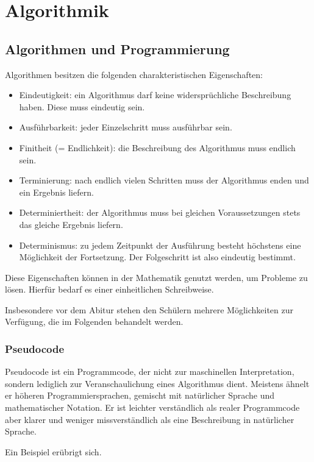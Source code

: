 \documentclass[main.tex]{subfiles}
\begin{document}
\chapter{Algorithmik}

\section{Algorithmen und Programmierung}
\begin{Definition}
	Algorithmen besitzen die folgenden charakteristischen Eigenschaften:
	\begin{itemize}
		\item Eindeutigkeit: ein Algorithmus darf keine widersprüchliche Beschreibung haben. Diese muss eindeutig sein.
		\item Ausführbarkeit: jeder Einzelschritt muss ausführbar sein.
		\item Finitheit (= Endlichkeit): die Beschreibung des Algorithmus muss endlich sein.
		\item Terminierung: nach endlich vielen Schritten muss der Algorithmus enden und ein Ergebnis liefern.
		\item Determiniertheit: der Algorithmus muss bei gleichen Voraussetzungen stets das gleiche Ergebnis liefern.
		\item   Determinismus: zu jedem Zeitpunkt der Ausführung besteht höchstens eine Möglichkeit der Fortsetzung. Der Folgeschritt ist also eindeutig bestimmt.
	\end{itemize}
\end{Definition}

Diese Eigenschaften können in der Mathematik genutzt werden, um Probleme zu lösen. Hierfür bedarf es einer einheitlichen Schreibweise.

Insbesondere vor dem Abitur stehen den Schülern mehrere Möglichkeiten zur Verfügung, die im Folgenden behandelt werden.

\subsection{Pseudocode}
Pseudocode ist ein Programmcode, der nicht zur maschinellen Interpretation, sondern lediglich zur Veranschaulichung eines Algorithmus dient. Meistens ähnelt er höheren Programmiersprachen, gemischt mit natürlicher Sprache und mathematischer Notation. Er ist leichter verständlich als realer Programmcode aber klarer und weniger missverständlich als eine Beschreibung in natürlicher Sprache.
\begin{Beispiel}
	Ein Beispiel erübrigt sich.
\end{Beispiel}
\end{document}
